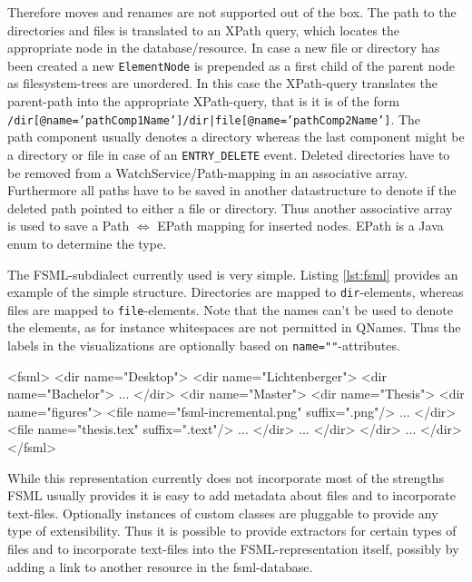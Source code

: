 Therefore moves and renames are not supported out of the box. The path to the directories and files is translated to an XPath query, which locates the appropriate node in the database/resource. In case a new file or directory has been created a new \texttt{ElementNode} is pre\-pen\-ded as a first child of the parent node as filesystem-trees are unordered. In this case the XPath-query translates the parent-path into the appropriate XPath-query, that is it is of the form \\\texttt{/dir[@name='pathComp1Name']/dir|file[@name='pathComp2Name']}. The \\path component usually denotes a directory whereas the last component might be a directory or file in case of an \texttt{ENTRY\_DELETE} event. Deleted directories have to be removed from a WatchService/Path-mapping in an associative array. Furthermore all paths have to be saved in another datastructure to denote if the deleted path pointed to either a file or directory. Thus another associative array is used to save a Path $\Leftrightarrow$ EPath mapping for inserted nodes. EPath is a Java enum to determine the type.

The FSML-subdialect currently used is very simple. Listing \ref{lst:fsml} provides an example of the simple structure. Directories are mapped to \texttt{dir}-elements, whereas files are mapped to \texttt{file}-elements. Note that the names can't be used to denote the elements, as for instance whitespaces are not permitted in QNames. Thus the labels in the visualizations are optionally based on \texttt{name=""}-attributes.

\begin{code}[caption=FSML structure]
<fsml>
  <dir name="Desktop">
    <dir name="Lichtenberger">
      <dir name="Bachelor">
        ...
      </dir>
      <dir name="Master">
        <dir name="Thesis">
          <dir name="figures">
            <file name="fsml-incremental.png" suffix=".png"/>
            ...
          </dir>
          <file name="thesis.tex" suffix=".text"/>
          ...
        </dir>
        ...
      </dir>
    </dir>
    ...
  </dir>
</fsml>
\end{code}
\label{lst:fsml}

While this representation currently does not incorporate most of the strengths FSML usually provides it is easy to add metadata about files and to incorporate text-files. Optionally instances of custom classes are pluggable to provide any type of extensibility. Thus it is possible to provide extractors for certain types of files and to incorporate text-files into the FSML-representation itself, possibly by adding a link to another resource in the fsml-database.

